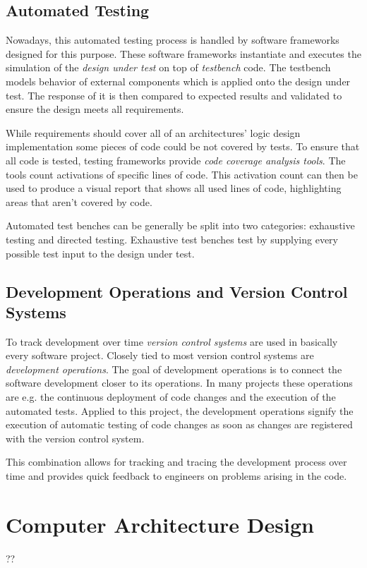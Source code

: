 \subsection{Automated Testing}
Nowadays, this automated testing process is handled by software frameworks designed for this purpose. These software frameworks instantiate and executes the simulation of the \textit{design under test} on top of \textit{testbench} code. The testbench models behavior of external components which is applied onto the design under test. The response of it is then compared to expected results and validated to ensure the design meets all requirements.

While requirements should cover all of an architectures' logic design implementation some pieces of code could be not covered by tests. To ensure that all code is tested, testing frameworks provide \textit{code coverage analysis tools}. The tools count activations of specific lines of code. This activation count can then be used to produce a visual report that shows all used lines of code, highlighting areas that aren't covered by code.

Automated test benches can be generally be split into two categories: exhaustive testing and directed testing. Exhaustive test benches test by supplying every possible test input to the design under test. 

\cite{verilogtestbenches} \cite{exhaustivetesting} \cite{directedtesting}


\subsection{Development Operations and Version Control Systems}
To track development over time \textit{version control systems} are used in basically every software project. Closely tied to most version control systems are \textit{development operations}. The goal of development operations is to connect the software development closer to its operations. In many projects these operations are e.g. the continuous deployment of code changes and the execution of the automated tests. Applied to this project, the development operations signify the execution of automatic testing of code changes as soon as changes are registered with the version control system. 

This combination allows for tracking and tracing the development process over time and provides quick feedback to engineers on problems arising in the code.

\section{Computer Architecture Design}
??

